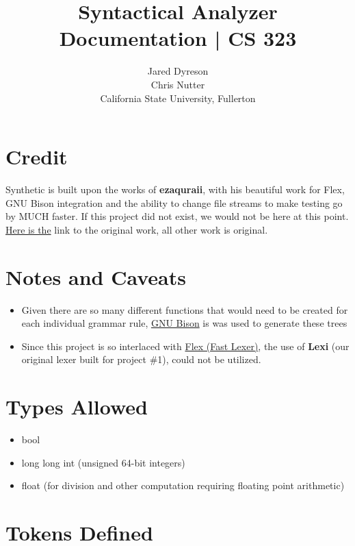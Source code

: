 \documentclass{article}
\title{Syntactical Analyzer Documentation | CS 323}
\author{Jared Dyreson\\ 
        Chris Nutter \\
        California State University, Fullerton}
\date
\begin{document}
\maketitle
\tableofcontents

\newpage

\section{Credit}

Synthetic is built upon the works of \textbf{ezaquraii}, with his beautiful work for
Flex, GNU Bison integration and the ability to change file streams to make
testing go by MUCH faster. If this project did not exist, we would not be here at
this point. \href{https://github.com/ezaquarii/bison-flex-cpp-example}{Here is the} link to the original work, all other work is original.

\section{Notes and Caveats}

\begin{itemize}
\item Given there are so many different functions that would need to be created for each individual grammar rule, \href{https://www.gnu.org/software/bison/}{GNU Bison} is was used to generate these trees
\item Since this project is so interlaced with \href{https://github.com/westes/flex/blob/master/README.md}{Flex (Fast Lexer)}, the use of \textbf{Lexi} (our original lexer built for project \#1), could not be utilized.
\end{itemize}

\section{Types Allowed}

\begin{itemize}
\item bool
\item long long int (unsigned 64-bit integers)
\item float (for division and other computation requiring floating point arithmetic)
\end{itemize}

\newpage

\section{Tokens Defined}
\end{document}
